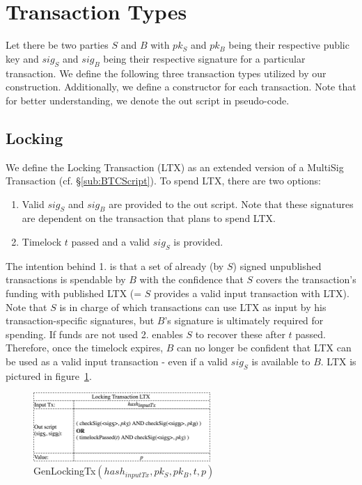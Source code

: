 \documentclass{cacthesis}
\begin{document}
	   \section{Transaction Types}
	   \label{sec:OurTransactionTypes}
        Let there be two parties $S$ and $B$ with $pk_S$ and $pk_B$  being their respective public key and $sig_S$ and $sig_B$ being their respective signature for a particular transaction. We define the following three transaction types utilized by our construction. Additionally, we define a constructor for each transaction. Note that for better understanding, we denote the out script in pseudo-code.
        
        \subsection{Locking}
        \label{sub:LockingTx}
        We define the Locking Transaction (LTX) as an extended version of a MultiSig Transaction (cf. §\ref{sub:BTCScript}). To spend LTX, there are two options:
        \begin{enumerate}
	        \item Valid $sig_S$ and $sig_B$ are provided to the out script. Note that these signatures are dependent on the transaction that plans to spend LTX.
	        \item Timelock $t$ passed and a valid $sig_S$ is provided.
        \end{enumerate}
        The intention behind 1. is that a set of already (by $S$) signed unpublished transactions is spendable by $B$ with the confidence that $S$ covers the transaction's funding with published LTX (= $S$ provides a valid input transaction with LTX). Note that $S$ is in charge of which transactions can use LTX as input by his transaction-specific signatures, but $B$'s signature is ultimately required for spending.
        If funds are not used 2. enables $S$ to recover these after $t$ passed. Therefore, once the timelock expires, $B$ can no longer be confident that LTX can be used as a valid input transaction - even if a valid $sig_S$ is available to $B$. LTX is pictured in \mbox{figure \ref{fig:genLockingTx}}.
        
        \begin{figure}
            \begin{center}
              \includegraphics[width=0.6\textwidth]{images/GenLockingTx.png}
              \caption{\textsf{GenLockingTx}$(hash_{inputTx}, pk_S, pk_B, t, p)$}
              \label{fig:genLockingTx}
            \end{center}
        \end{figure}
        
\end{document}
